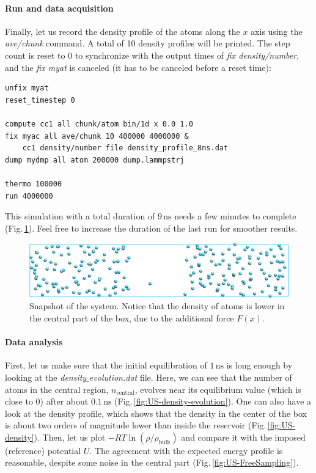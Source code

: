 \documentclass[9pt,tutorial]{livecoms}
\begin{document}
\paragraph{Run and data acquisition}
Finally, let us record the density profile of the atoms along the $x$ axis using the \textit{ave/chunk} command. A total of 10 density profiles will be printed. The step count is reset to 0 to synchronize with the output times of \textit{fix density/number}, and the \textit{fix myat} is canceled (it has to be canceled before a reset time):
{\normalsize \begin{verbatim}
unfix myat
reset_timestep 0

compute cc1 all chunk/atom bin/1d x 0.0 1.0
fix myac all ave/chunk 10 400000 4000000 &
    cc1 density/number file density_profile_8ns.dat
dump mydmp all atom 200000 dump.lammpstrj

thermo 100000
run 4000000
\end{verbatim}}
This simulation with a total duration of $9\,\text{ns}$ needs a few minutes to complete (Fig.\,\ref{fig:US-system}). Feel free to increase the duration of the last run for smoother results.

\begin{figure}
\centering
\includegraphics[width=\linewidth]{US-system}
\caption{Snapshot of the system. Notice that the density of atoms is lower in the central part of the box, due to the additional force $F (x)$.}
\label{fig:US-system}
\end{figure}

\paragraph{Data analysis}
First, let us make sure that the initial equilibration of $1\,\text{ns}$ is long enough by looking at the \textit{density$\_$evolution.dat} file. Here, we can see that the number of atoms in the central region, $n_\mathrm{central}$, evolves near its equilibrium value (which is close to 0) after about $0.1\,\text{ns}$ (Fig.\,\ref{fig:US-density-evolution}). One can also have a look at the density profile, which shows that the density in the center of the box is about two orders of magnitude lower than inside the reservoir (Fig.\,\ref{fig:US-density}). Then, let us plot $-R T \ln(\rho/\rho_\mathrm{bulk})$ and compare it with the imposed (reference) potential $U$. The agreement with the expected energy profile is reasonable, despite some noise in the central part (Fig.\,\ref{fig:US-FreeSampling}). 
\end{document}
